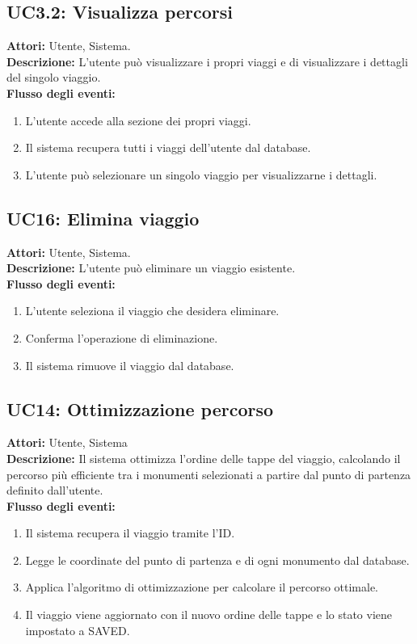 \subsection*{UC3.2: Visualizza percorsi}
\textbf{Attori:} Utente, Sistema. \\
\textbf{Descrizione:} L'utente può visualizzare i propri viaggi e di visualizzare i dettagli del singolo viaggio. \\
\textbf{Flusso degli eventi:}
\begin{enumerate}
    \setlength{\itemsep}{0pt}
    \setlength{\parskip}{0pt}
    \item L'utente accede alla sezione dei propri viaggi.
    \item Il sistema recupera tutti i viaggi dell'utente dal database.
    \item L'utente può selezionare un singolo viaggio per visualizzarne i dettagli.
\end{enumerate}

\subsection*{UC16: Elimina viaggio}
\textbf{Attori:} Utente, Sistema. \\
\textbf{Descrizione:} L'utente può eliminare un viaggio esistente. \\
\textbf{Flusso degli eventi:}
\begin{enumerate}
    \setlength{\itemsep}{0pt}
    \setlength{\parskip}{0pt}
    \item L'utente seleziona il viaggio che desidera eliminare.
    \item Conferma l'operazione di eliminazione.
    \item Il sistema rimuove il viaggio dal database.
\end{enumerate}

\subsection*{UC14: Ottimizzazione percorso}
\textbf{Attori:} Utente, Sistema \\
\textbf{Descrizione:} Il sistema ottimizza l'ordine delle tappe del viaggio, calcolando il percorso più efficiente tra i monumenti selezionati a partire dal punto di partenza definito dall'utente. \\
\textbf{Flusso degli eventi:}
\begin{enumerate}
    \setlength{\itemsep}{0pt}
    \setlength{\parskip}{0pt}
    \item Il sistema recupera il viaggio tramite l'ID.
    \item Legge le coordinate del punto di partenza e di ogni monumento dal database.
    \item Applica l'algoritmo di ottimizzazione per calcolare il percorso ottimale.
    \item Il viaggio viene aggiornato con il nuovo ordine delle tappe e lo stato viene impostato a SAVED.
\end{enumerate}
